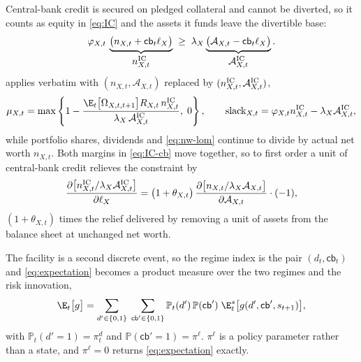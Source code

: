 Central-bank credit is secured on pledged collateral and cannot be diverted, so it
counts as equity in \eqref{eq:IC} and the assets it funds leave the divertible
base:
\begin{equation}
\varphi_{X,t}\,\underbrace{\bigl(n_{X,t}+\mathsf{cb}_t\ell_X\bigr)}
                          _{\textstyle n^{\rm IC}_{X,t}}
\;\ge\;
\lambda_X\underbrace{\bigl(\mathcal{A}_{X,t}-\mathsf{cb}_t\ell_X\bigr)}
                    _{\textstyle \mathcal{A}^{\rm IC}_{X,t}}.
\label{eq:IC-cb}
\end{equation}
 applies verbatim with $(n_{X,t},\mathcal{A}_{X,t})$ replaced by
$(n^{\rm IC}_{X,t},\mathcal{A}^{\rm IC}_{X,t})$,
\begin{equation}
\mu_{X,t}=\max\left\{1-\frac{\E_t\bigl[\Omega_{X,t,t+1}\bigr]R_{X,t}\,
                             n^{\rm IC}_{X,t}}
                            {\lambda_X\,\mathcal{A}^{\rm IC}_{X,t}},\;0\right\},
\qquad
\mathrm{slack}_{X,t}=\varphi_{X,t}n^{\rm IC}_{X,t}-\lambda_X\mathcal{A}^{\rm IC}_{X,t},
\label{eq:mu-cb}
\end{equation}
while portfolio shares, dividends and \eqref{eq:nw-lom} continue to divide by
actual net worth $n_{X,t}$. Both margins in \eqref{eq:IC-cb} move together, so to
first order a unit of central-bank credit relieves the constraint by
\begin{equation}
\frac{\partial\bigl[n^{\rm IC}_{X,t}/\lambda_X\mathcal{A}^{\rm IC}_{X,t}\bigr]}
     {\partial\ell_X}
=\bigl(1+\theta_{X,t}\bigr)\,
 \frac{\partial\bigl[n_{X,t}/\lambda_X\mathcal{A}_{X,t}\bigr]}{\partial\mathcal{A}_{X,t}}
 \cdot(-1),
\label{eq:relief-ratio}
\end{equation}
$(1+\theta_{X,t})$ times the relief delivered by removing a unit of assets from
the balance sheet at unchanged net worth.

The facility is a second discrete event, so the regime index is the pair
$(d_t,\mathsf{cb}_t)$ and \eqref{eq:expectation} becomes a product measure over
the two regimes and the risk innovation,
\begin{equation}
\E_t\bigl[g\bigr]
=\sum_{d'\in\{0,1\}}\;\sum_{\mathsf{cb}'\in\{0,1\}}
  \mathbb{P}_t(d')\,\mathbb{P}(\mathsf{cb}')\;
  \E^{s}_t\bigl[g(d',\mathsf{cb}',s_{t+1})\bigr],
\label{eq:expectation-compound}
\end{equation}
with $\mathbb{P}_t(d'=1)=\pi^{d}_t$ and $\mathbb{P}(\mathsf{cb}'=1)=\pi^{\ell}$.
$\pi^{\ell}$ is a policy parameter rather than a state, and $\pi^{\ell}=0$ returns
\eqref{eq:expectation} exactly.

